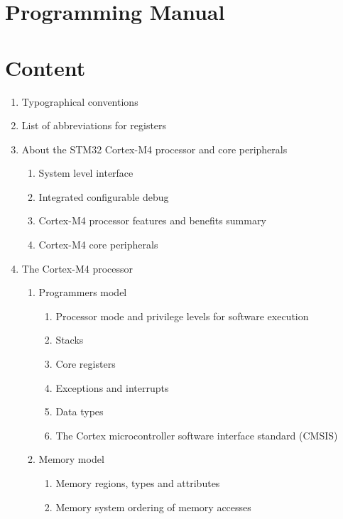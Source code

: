 \documentclass{article}
\begin{document}
\section*{Programming Manual}

\tableofcontents

\section*{Content}
\begin{enumerate}
    \item Typographical conventions 
    \item List of abbreviations for registers 
    \item About the STM32 Cortex-M4 processor and core peripherals 
    \begin{enumerate}
        \item System level interface 
        \item Integrated configurable debug 
        \item Cortex-M4 processor features and benefits summary 
        \item Cortex-M4 core peripherals 
    \end{enumerate}
    \item The Cortex-M4 processor 
    \begin{enumerate}
        \item Programmers model 
        \begin{enumerate}
            \item Processor mode and privilege levels for software execution 
            \item Stacks 
            \item Core registers 
            \item Exceptions and interrupts 
            \item Data types 
            \item The Cortex microcontroller software interface standard (CMSIS) 
        \end{enumerate}
        \item Memory model 
        \begin{enumerate}
            \item Memory regions, types and attributes 
            \item Memory system ordering of memory accesses 

\end{enumerate}
\end{enumerate}
\end{enumerate}
\end{document}
